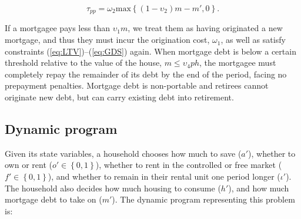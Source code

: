 \documentclass[parskip=full]{article}
\begin{document}
\begin{equation}\label{eq:prepayment_penalty}
\tau_{pp}=\omega_{2}\mbox{max}\left\{(1-\upsilon_{2})m-m',0\right\}.
\end{equation}

\noindent If a mortgagee pays less than $\upsilon_{1}m$, we treat them as having originated a new mortgage, and thus they must incur the origination cost, $\omega_{1}$, as well as satisfy constraints (\ref{eq:LTV})--(\ref{eq:GDS}) again. When mortgage debt is below a certain threshold relative to the value of the house, $m \leq \upsilon_{4}ph$, the mortgagee must completely repay the remainder of its debt by the end of the period, facing no prepayment penalties. Mortgage debt is non-portable and retirees cannot originate new debt, but can carry existing debt into retirement. 

\subsection{Dynamic program}\label{subsection:household_optimization}
Given its state variables, a household chooses how much to save ($a'$), whether to own or rent ($o' \in \left\{0,1\right\}$), whether to rent in the controlled or free market ($f' \in \left\{0,1\right\}$), and whether to remain in their rental unit one period longer ($\iota'$). The household also decides how much housing to consume ($h'$), and how much mortgage debt to take on ($m'$). The dynamic program representing this problem is:
\end{document}
